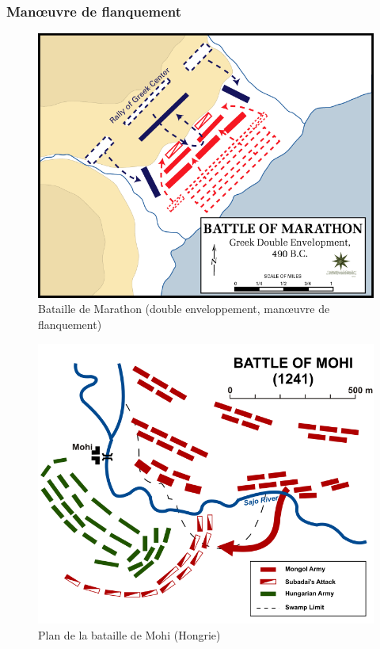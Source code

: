 \documentclass{article}
\begin{document}
\subsubsection{Manœuvre de flanquement}
\begin{figure}[H]
	\begin{centering}
	\includegraphics[width=\linewidth]{../ressources/Battle_of_Marathon}
	\caption{Bataille de Marathon (double enveloppement, manœuvre de flanquement) \cite{flanking_maneuver}}
	\end{centering}
\end{figure}
\begin{figure}[H]
	\begin{centering}
	\includegraphics[width=\linewidth]{../ressources/Battle_of_Mohi}
	\caption{Plan de la bataille de Mohi (Hongrie) \cite{mohi_battle}}
	\end{centering}
\end{figure}
\cite{tactic,pincer_tactic}
\end{document}
